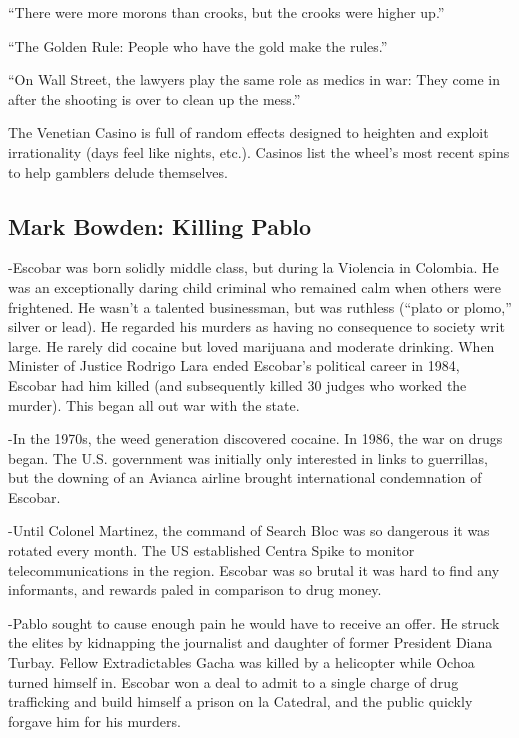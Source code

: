 \documentclass[
]{article}
\begin{document}
``There were more morons than crooks, but the crooks were higher up.''

``The Golden Rule: People who have the gold make the rules.''

``On Wall Street, the lawyers play the same role as medics in war: They
come in after the shooting is over to clean up the mess.''

The Venetian Casino is full of random effects designed to heighten and
exploit irrationality (days feel like nights, etc.). Casinos list the
wheel's most recent spins to help gamblers delude themselves.

\hypertarget{mark-bowden-killing-pablo}{%
\subsection{Mark Bowden: Killing
Pablo}\label{mark-bowden-killing-pablo}}

-Escobar was born solidly middle class, but during la Violencia in
Colombia. He was an exceptionally daring child criminal who remained
calm when others were frightened. He wasn't a talented businessman, but
was ruthless (``plato or plomo,'' silver or lead). He regarded his
murders as having no consequence to society writ large. He rarely did
cocaine but loved marijuana and moderate drinking. When Minister of
Justice Rodrigo Lara ended Escobar's political career in 1984, Escobar
had him killed (and subsequently killed 30 judges who worked the
murder). This began all out war with the state.

-In the 1970s, the weed generation discovered cocaine. In 1986, the war
on drugs began. The U.S. government was initially only interested in
links to guerrillas, but the downing of an Avianca airline brought
international condemnation of Escobar.

-Until Colonel Martinez, the command of Search Bloc was so dangerous it
was rotated every month. The US established Centra Spike to monitor
telecommunications in the region. Escobar was so brutal it was hard to
find any informants, and rewards paled in comparison to drug money.

-Pablo sought to cause enough pain he would have to receive an offer. He
struck the elites by kidnapping the journalist and daughter of former
President Diana Turbay. Fellow Extradictables Gacha was killed by a
helicopter while Ochoa turned himself in. Escobar won a deal to admit to
a single charge of drug trafficking and build himself a prison on la
Catedral, and the public quickly forgave him for his murders.
\end{document}
